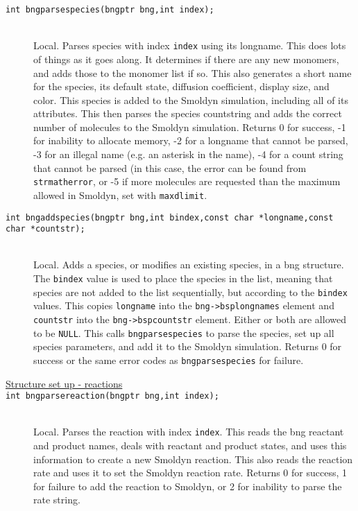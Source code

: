 \documentclass {book}
\begin{document}
\begin{description}
\item[\texttt{int bngparsespecies(bngptr bng,int index);}]
\hfill \\
Local.  Parses species with index \texttt{index} using its longname.  This does lots of things as it goes along.  It determines if there are any new monomers, and adds those to the monomer list if so.  This also generates a short name for the species, its default state, diffusion coefficient, display size, and color.  This species is added to the Smoldyn simulation, including all of its attributes.  This then parses the species countstring and adds the correct number of molecules to the Smoldyn simulation.  Returns 0 for success, -1 for inability to allocate memory, -2 for a longname that cannot be parsed, -3 for an illegal name (e.g. an asterisk in the name), -4 for a count string that cannot be parsed (in this case, the error can be found from \texttt{strmatherror}, or -5 if more molecules are requested than the maximum allowed in Smoldyn, set with \texttt{maxdlimit}.

\item[\texttt{int bngaddspecies(bngptr bng,int bindex,const char *longname,const char *countstr);}]
\hfill \\
Local.  Adds a species, or modifies an existing species, in a bng structure.  The \texttt{bindex} value is used to place the species in the list, meaning that species are not added to the list sequentially, but according to the \texttt{bindex} values.  This copies \texttt{longname} into the \texttt{bng->bsplongnames} element and \texttt{countstr} into the \texttt{bng->bspcountstr} element.  Either or both are allowed to be \texttt{NULL}.  This calls \texttt{bngparsespecies} to parse the species, set up all species parameters, and add it to the Smoldyn simulation.  Returns 0 for success or the same error codes as \texttt{bngparsespecies} for failure.

\item[\underline{Structure set up - reactions}]

\item[\texttt{int bngparsereaction(bngptr bng,int index);}]
\hfill \\
Local.  Parses the reaction with index \texttt{index}.  This reads the bng reactant and product names, deals with reactant and product states, and uses this information to create a new Smoldyn reaction.  This also reads the reaction rate and uses it to set the Smoldyn reaction rate.  Returns 0 for success, 1 for failure to add the reaction to Smoldyn, or 2 for inability to parse the rate string.


\end{description}
\end{document}
